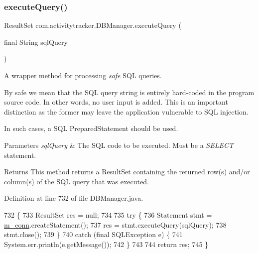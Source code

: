 \subsubsection{\texorpdfstring{execute\+Query()}{executeQuery()}}
{\footnotesize\ttfamily Result\+Set com.\+activitytracker.\+D\+B\+Manager.\+execute\+Query (\begin{DoxyParamCaption}\item[{final String}]{sql\+Query }\end{DoxyParamCaption})\hspace{0.3cm}{\ttfamily [private]}}

A wrapper method for processing {\itshape safe} S\+QL queries.

By safe we mean that the S\+QL query string is entirely hard-\/coded in the program source code. In other words, no user input is added. This is an important distinction as the former may leave the application vulnerable to S\+QL injection.

In such cases, a S\+QL Prepared\+Statement should be used.


\begin{DoxyParams}{Parameters}
{\em sql\+Query} & The S\+QL code to be executed. Must be a {\itshape S\+E\+L\+E\+CT} statement.\\
\hline
\end{DoxyParams}
\begin{DoxyReturn}{Returns}
This method returns a Result\+Set containing the returned row(s) and/or column(s) of the S\+QL query that was executed. 
\end{DoxyReturn}


Definition at line 732 of file D\+B\+Manager.\+java.


\begin{DoxyCode}
732                                                           \{
733         ResultSet res = null;
734 
735         \textcolor{keywordflow}{try} \{
736             Statement stmt = \mbox{\hyperlink{classcom_1_1activitytracker_1_1_d_b_manager_a064088d13ac09eb147fdc19268771521}{m\_conn}}.createStatement();
737             res = stmt.executeQuery(sqlQuery);
738             stmt.close();
739         \}
740         \textcolor{keywordflow}{catch} (\textcolor{keyword}{final} SQLException e) \{
741             System.err.println(e.getMessage());
742         \}
743 
744         \textcolor{keywordflow}{return} res;
745     \}
\end{DoxyCode}
\mbox{\label{classcom_1_1activitytracker_1_1_d_b_manager_a382397e2bdf309901d1c80ff66be69b7}} 
